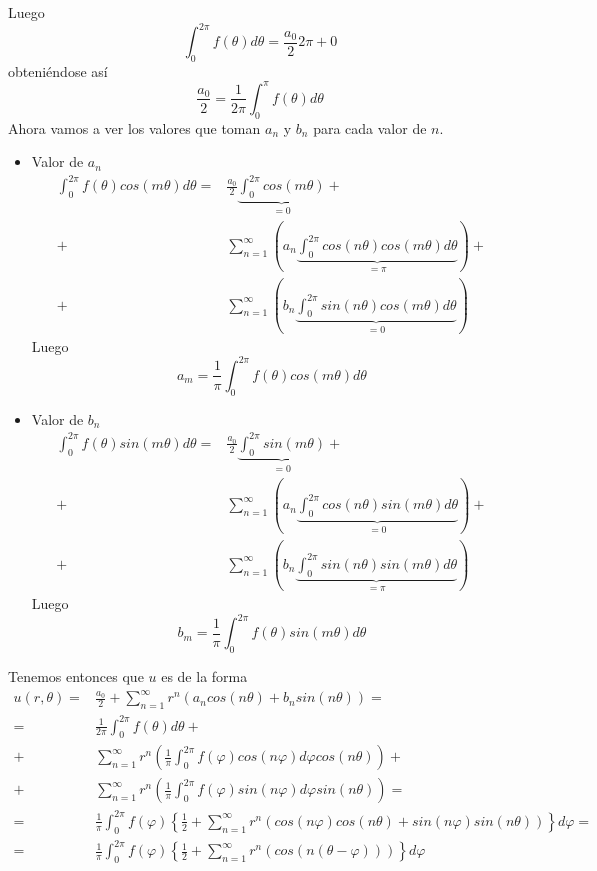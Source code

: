 Luego
$$\int_0^{2\pi} f(\theta)d\theta = \frac{a_0}{2}2\pi+0$$
obteniéndose así
$$\frac{a_0}{2} = \frac{1}{2\pi}\int_0^{\pi}f(\theta)d\theta$$
Ahora vamos a ver los valores que toman $a_n$ y $b_n$ para cada valor de $n$.
\begin{itemize}
\item Valor de $a_n$
\begin{align*}
\int_0^{2\pi}f(\theta)cos(m\theta)d\theta = & \frac{a_0}{2}\underbrace{\int_0^{2\pi}cos(m\theta)}_{=0} +\\
+ & \sum_{n=1}^\infty\left(a_n\underbrace{\int_0^{2\pi}cos(n\theta)cos(m\theta)d\theta}_{=\pi}\right) +\\
+ & \sum_{n=1}^\infty\left(b_n\underbrace{\int_0^{2\pi}sin(n\theta)cos(m\theta)d\theta}_{=0}\right)
\end{align*}
Luego
$$a_m = \frac{1}{\pi}\int_0^{2\pi}f(\theta)cos(m\theta)d\theta$$
\item Valor de $b_n$
\begin{align*}
\int_0^{2\pi}f(\theta)sin(m\theta)d\theta = & \frac{a_0}{2}\underbrace{\int_0^{2\pi}sin(m\theta)}_{=0} +\\
+ & \sum_{n=1}^\infty\left(a_n\underbrace{\int_0^{2\pi}cos(n\theta)sin(m\theta)d\theta}_{=0}\right) +\\
+ & \sum_{n=1}^\infty\left(b_n\underbrace{\int_0^{2\pi}sin(n\theta)sin(m\theta)d\theta}_{=\pi}\right)
\end{align*}
Luego
$$b_m = \frac{1}{\pi}\int_0^{2\pi}f(\theta)sin(m\theta)d\theta$$
\end{itemize}
Tenemos entonces que $u$ es de la forma
\begin{align*}
u(r,\theta) = & \frac{a_0}{2}+\sum_{n=1}^\infty r^n\left(a_ncos(n\theta)+b_n sin(n\theta)\right) =\\
= & \frac{1}{2\pi}\int_0^{2\pi}f(\theta)d\theta+\\
+ & \sum_{n=1}^\infty r^n\left(\frac{1}{\pi}\int_0^{2\pi}f(\varphi)cos(n\varphi)d\varphi cos(n\theta)\right) + \\
+ & \sum_{n=1}^\infty r^n\left(\frac{1}{\pi}\int_0^{2\pi}f(\varphi)sin(n\varphi)d\varphi sin(n\theta)\right) = \\
= & \frac{1}{\pi}\int_0^{2\pi}f(\varphi)\left\{\frac{1}{2}+\sum_{n=1}^\infty r^n\left(cos(n\varphi)cos(n\theta)+sin(n\varphi)sin(n\theta)\right)\right\}d\varphi = \\
= & \frac{1}{\pi}\int_0^{2\pi}f(\varphi)\left\{\frac{1}{2}+\sum_{n=1}^\infty r^n\left(cos(n(\theta-\varphi))\right)\right\}d\varphi 
\end{align*}
